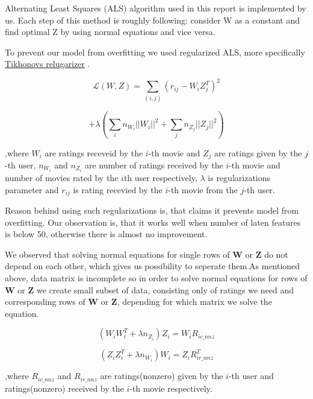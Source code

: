 Alternating Least Squares (ALS) algorithm used in this report is implemented by us. Each step of this method is roughly following: consider W as a constant and find optimal Z by using normal equations and vice versa. 

To prevent our model from overfitting we used regularized ALS, more specifically 
\href{https://en.wikipedia.org/wiki/Tikhonov_regularization}{Tikhonovs relugarizer}
. 

$$ \mathcal{L}(W,Z)=\sum_{(i,j)}(r_{ij}-W_iZ_j^T)^2$$

$$+\lambda(\sum_i n_{W_i}||W_i||^2+\sum_j n_{Z_j}||Z_j||^2)$$

,where $W_i$ are ratings receveid by the $i$-th movie and $Z_j$ are ratings given by the $j$-th user,  $n_{W_i}$ and $n_{Z_i}$ are number of ratings received by the $i$-th movie and number of movies rated by the $i$th user respectively, $\lambda$ is regularizations parameter and $r_{ij}$ is rating recevied by the $i$-th movie from the $j$-th user.

Reason behind using such regularizations is, that 
\cite{Zhou2008}
 claims it prevents model from overfitting. Our observation is, that it works well when number of laten features is below 50, otherwise there is almost no improvement. 

We observed that solving normal equations for single rows of $\textbf{W}$ or $\textbf{Z}$ do not depend on each other, which gives us possibility to seperate them.As mentioned above, data matrix is incomplete so in order to solve normal equations for rows of $\textbf{W}$  or $\textbf{Z}$ we create small subset of data, consisting only of ratings we need and corresponding rows of $\textbf{W}$ or $\textbf{Z}$, depending for which matrix we solve the equation. 

$$(W_iW_i^T + \lambda n_{Z_i})Z_i=W_iR_{ic\_nnz} $$

$$(Z_iZ_i^T + \lambda n_{W_i})W_i=Z_iR^T_{ir\_nnz}$$

,where $R_{ic\_nnz}$ and $R_{ir\_nnz}$ are ratings(nonzero) given by the $i$-th user and ratings(nonzero) received by the $i$-th movie respectively.




